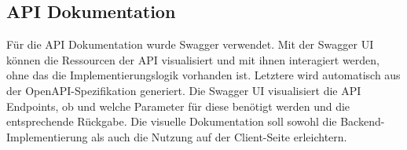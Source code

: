 \subsection{API Dokumentation}
Für die API Dokumentation wurde Swagger verwendet. Mit der Swagger UI können die Ressourcen der API visualisiert und mit ihnen interagiert werden, ohne das die Implementierungslogik vorhanden ist. \cite{swagger} Letztere wird automatisch aus der OpenAPI-Spezifikation generiert. Die Swagger UI visualisiert die API Endpoints, ob und welche Parameter für diese benötigt werden und die entsprechende Rückgabe. Die visuelle Dokumentation soll sowohl die Backend-Implementierung als auch die Nutzung auf der Client-Seite erleichtern. 



